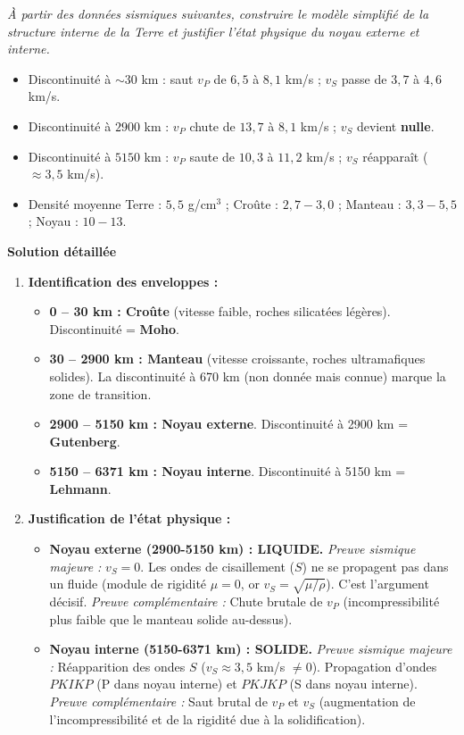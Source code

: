 \documentclass[11pt]{article}
\begin{document}
\begin{exoresolu}
\emph{À partir des données sismiques suivantes, construire le modèle simplifié de la structure interne de la Terre et justifier l'état physique du noyau externe et interne.}
\begin{itemize}
    \item Discontinuité à $\sim 30$ km : saut $v_P$ de $6,5$ à $8,1$ km/s ; $v_S$ passe de $3,7$ à $4,6$ km/s.
    \item Discontinuité à $2900$ km : $v_P$ chute de $13,7$ à $8,1$ km/s ; $v_S$ devient \textbf{nulle}.
    \item Discontinuité à $5150$ km : $v_P$ saute de $10,3$ à $11,2$ km/s ; $v_S$ réapparaît ($\approx 3,5$ km/s).
    \item Densité moyenne Terre : $5,5$ g/cm$^3$ ; Croûte : $2,7-3,0$ ; Manteau : $3,3-5,5$ ; Noyau : $10-13$.
\end{itemize}
\tcblower
\textbf{Solution détaillée}
\begin{enumerate}
    \item \textbf{Identification des enveloppes :}
    \begin{itemize}
        \item \textbf{0 -- 30 km : Croûte} (vitesse faible, roches silicatées légères). Discontinuité = \textbf{Moho}.
        \item \textbf{30 -- 2900 km : Manteau} (vitesse croissante, roches ultramafiques solides). La discontinuité à 670 km (non donnée mais connue) marque la zone de transition.
        \item \textbf{2900 -- 5150 km : Noyau externe}. Discontinuité à 2900 km = \textbf{Gutenberg}.
        \item \textbf{5150 -- 6371 km : Noyau interne}. Discontinuité à 5150 km = \textbf{Lehmann}.
    \end{itemize}

    \item \textbf{Justification de l'état physique :}
    \begin{itemize}
        \item \textbf{Noyau externe (2900-5150 km) : LIQUIDE.}
        \emph{Preuve sismique majeure :} $v_S = 0$. Les ondes de cisaillement ($S$) ne se propagent pas dans un fluide (module de rigidité $\mu = 0$, or $v_S = \sqrt{\mu/\rho}$). C'est l'argument décisif.
        \emph{Preuve complémentaire :} Chute brutale de $v_P$ (incompressibilité plus faible que le manteau solide au-dessus).
        \item \textbf{Noyau interne (5150-6371 km) : SOLIDE.}
        \emph{Preuve sismique majeure :} Réapparition des ondes $S$ ($v_S \approx 3,5$ km/s $\neq 0$). Propagation d'ondes $PKIKP$ (P dans noyau interne) et $PKJKP$ (S dans noyau interne).
        \emph{Preuve complémentaire :} Saut brutal de $v_P$ et $v_S$ (augmentation de l'incompressibilité et de la rigidité due à la solidification).
    \end{itemize}


\end{enumerate}
\end{exoresolu}
\end{document}
